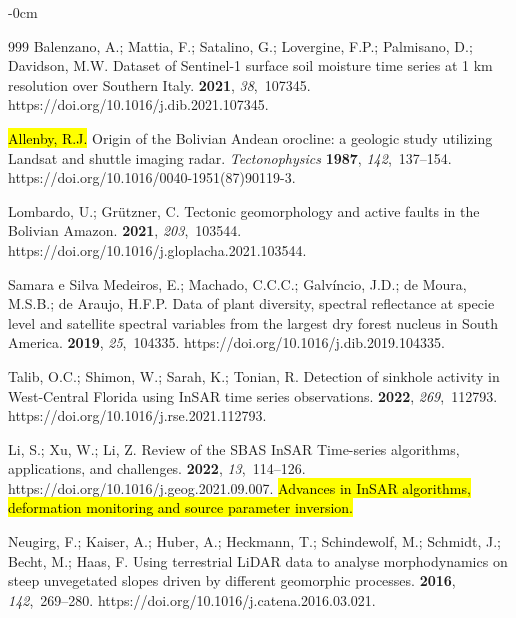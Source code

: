 \documentclass[data,article,accept,pdftex,moreauthors]{Definitions/mdpi}
\begin{document}
{\begin{adjustwidth}{-\extralength}{0cm}
\begin{thebibliography}{999}
Balenzano, A.; Mattia, F.; Satalino, G.; Lovergine, F.P.; Palmisano, D.;
 Davidson, M.W.
\newblock Dataset of Sentinel-1 surface soil moisture time series at 1 km
 resolution over Southern Italy.
 {\bf 2021}, {\em 38},~107345.
https://doi.org/10.1016/j.dib.2021.107345.

\hl{Allenby, R.J.} %
Origin of the Bolivian Andean orocline: a geologic study utilizing Landsat and shuttle imaging radar. {\em Tectonophysics} {\bf 1987}, {\em 142},~137--154. https://doi.org/10.1016/0040-1951(87)90119-3.


Lombardo, U.; Gr\"utzner, C.
\newblock Tectonic geomorphology and active faults in the Bolivian Amazon.
 {\bf 2021}, {\em 203},~103544.
https://doi.org/10.1016/j.gloplacha.2021.103544.

{Samara e Silva Medeiros}, E.; Machado, C.C.C.; Galvíncio, J.D.; {de Moura},
 M.S.B.; {de Araujo}, H.F.P.
\newblock Data of plant diversity, spectral reflectance at specie level and
 satellite spectral variables from the largest dry forest nucleus in South
 America.
 {\bf 2019}, {\em 25},~104335.
https://doi.org/10.1016/j.dib.2019.104335.

Talib, O.C.; Shimon, W.; Sarah, K.; Tonian, R.
\newblock Detection of sinkhole activity in West-Central Florida using InSAR
 time series observations.
 {\bf 2022}, {\em 269},~112793.
https://doi.org/10.1016/j.rse.2021.112793.

Li, S.; Xu, W.; Li, Z.
\newblock Review of the SBAS InSAR Time-series algorithms, applications, and
 challenges.
 {\bf 2022}, {\em 13},~114--126. https://doi.org/10.1016/j.geog.2021.09.007. \hl{Advances in InSAR algorithms, deformation monitoring and source parameter inversion.} %

Neugirg, F.; Kaiser, A.; Huber, A.; Heckmann, T.; Schindewolf, M.; Schmidt, J.;
 Becht, M.; Haas, F.
\newblock Using terrestrial LiDAR data to analyse morphodynamics on steep
 unvegetated slopes driven by different geomorphic processes.
 {\bf 2016}, {\em 142},~269--280.
https://doi.org/10.1016/j.catena.2016.03.021.


\end{thebibliography}
\end{adjustwidth}}
\end{document}
